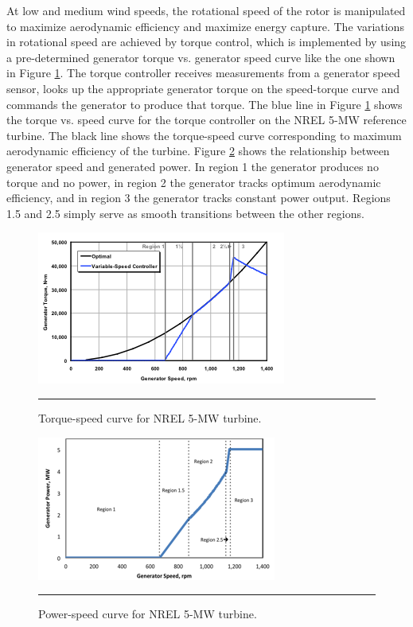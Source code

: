 At low and medium wind speeds, the rotational speed of the rotor is manipulated to maximize aerodynamic efficiency and maximize energy capture.  The variations in rotational speed are achieved by torque control, which is implemented by using a pre-determined generator torque vs. generator speed curve like the one shown in Figure \ref{fig1-2}.  The torque controller receives measurements from a generator speed sensor, looks up the appropriate generator torque on the speed-torque curve and commands the generator to produce that torque. The blue line in Figure \ref{fig1-2} shows the torque vs. speed curve for the torque controller on the NREL 5-MW reference turbine.  The black line shows the torque-speed curve corresponding to maximum aerodynamic efficiency of the turbine. Figure \ref{fig1-3} shows the relationship between generator speed and generated power. In region 1 the generator produces no torque and no power, in region 2 the generator tracks optimum aerodynamic efficiency, and in region 3 the generator tracks constant power output.  Regions 1.5 and 2.5 simply serve as smooth transitions between the other regions. 



\begin{figure}[htbp]
	\centering
		\includegraphics{Figures/ch1Figures/fig1-2.png}
		\rule{35em}{0.5pt}
	\caption{Torque-speed curve for NREL 5-MW turbine.\cite{jonkman2009}}
	\label{fig1-2}
\end{figure}

\begin{figure}[htbp]
	\centering
		\includegraphics{Figures/ch1Figures/fig1-3.png}
		\rule{35em}{0.5pt}
	\caption{Power-speed curve for NREL 5-MW turbine.}
	\label{fig1-3}
\end{figure}

